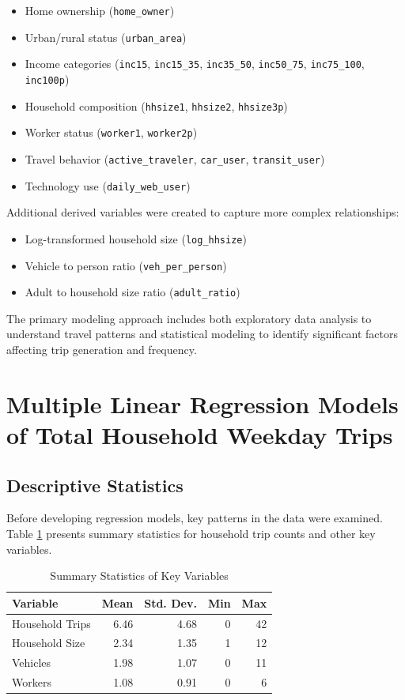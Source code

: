 \documentclass[12pt]{article}
\begin{document}
\begin{itemize}
    \item Home ownership (\texttt{home\_owner})
    \item Urban/rural status (\texttt{urban\_area})
    \item Income categories (\texttt{inc15}, \texttt{inc15\_35}, \texttt{inc35\_50}, \texttt{inc50\_75}, \texttt{inc75\_100}, \texttt{inc100p})
    \item Household composition (\texttt{hhsize1}, \texttt{hhsize2}, \texttt{hhsize3p})
    \item Worker status (\texttt{worker1}, \texttt{worker2p})
    \item Travel behavior (\texttt{active\_traveler}, \texttt{car\_user}, \texttt{transit\_user})
    \item Technology use (\texttt{daily\_web\_user})
\end{itemize}

Additional derived variables were created to capture more complex relationships:
\begin{itemize}
    \item Log-transformed household size (\texttt{log\_hhsize})
    \item Vehicle to person ratio (\texttt{veh\_per\_person})
    \item Adult to household size ratio (\texttt{adult\_ratio})
\end{itemize}

The primary modeling approach includes both exploratory data analysis to understand travel patterns and statistical modeling to identify significant factors affecting trip generation and frequency.

\section{Multiple Linear Regression Models of Total Household Weekday Trips}

\subsection{Descriptive Statistics}

Before developing regression models, key patterns in the data were examined. Table \ref{tab:trip_stats} presents summary statistics for household trip counts and other key variables.

\begin{table}[h]
\centering
\caption{Summary Statistics of Key Variables}
\label{tab:trip_stats}
\begin{tabular}{lrrrr}
\toprule
Variable & Mean & Std. Dev. & Min & Max \\
\midrule
Household Trips & 6.46 & 4.68 & 0 & 42 \\
Household Size & 2.34 & 1.35 & 1 & 12 \\
Vehicles & 1.98 & 1.07 & 0 & 11 \\
Workers & 1.08 & 0.91 & 0 & 6 \\
\bottomrule
\end{tabular}
\end{table}
\end{document}
